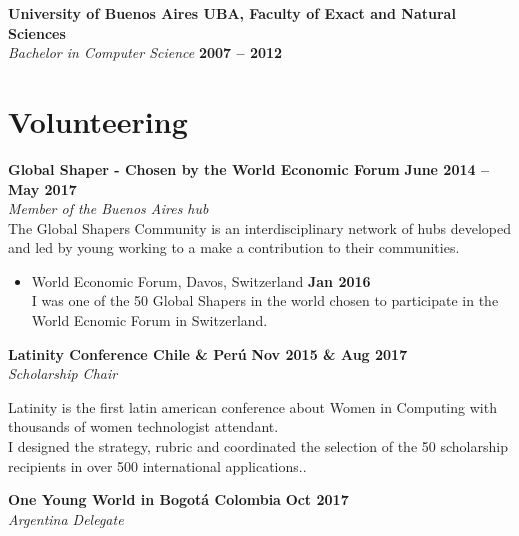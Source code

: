 \documentclass[margin,line]{resume}
\begin{document}
\begin{resume}
\textbf{University of Buenos Aires UBA, Faculty of Exact and Natural Sciences} \vspace{2mm}\\\vspace{1mm}
\textsl{Bachelor in Computer Science} \hfill \textbf{2007 -- 2012}\vspace{-3mm}\\\vspace{-1mm}


\section{\mysidestyle Volunteering}



\textbf{Global Shaper - Chosen by the World Economic Forum} \hfill \textbf{June 2014 -- May 2017} \vspace{2mm}\\\vspace{1mm}
\textsl{Member of the Buenos Aires hub} \\
The Global Shapers Community is an interdisciplinary network of hubs developed and led by young working to a make a contribution to their communities.

\begin{itemize}
\item  World Economic Forum, Davos, Switzerland \hfill \textbf{Jan 2016} \vspace{2mm} \\
I was one of the 50 Global Shapers in the world chosen to participate in the World Ecnomic Forum in Switzerland.
\end{itemize}

\textbf{Latinity Conference Chile \& Per\'u } \hfill 
 \hfill \textbf{Nov 2015 \& Aug 2017} \vspace{2mm}\\\vspace{1mm}
 \textsl{Scholarship Chair } 

Latinity is the first latin american conference about Women in Computing with thousands of women technologist attendant.\\
I designed the strategy, rubric and coordinated the selection of the 50 scholarship recipients in over 500 international applications..

\textbf{ One Young World in Bogot\'a Colombia} \hfill 
 \hfill \textbf{Oct 2017} \vspace{2mm}\\\vspace{1mm}
\textsl{Argentina Delegate } 


\end{resume}
\end{document}
